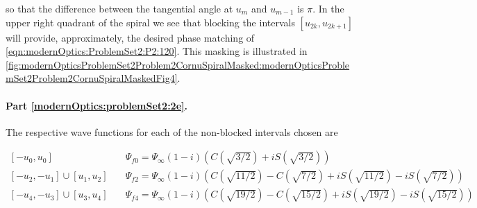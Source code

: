 {so that the difference between the tangential angle at $u_m$ and $u_{m-1}$ is $\pi$.  In the upper right quadrant of the spiral we see that blocking the intervals $[u_{2k}, u_{2k+1}]$ will provide, approximately, the desired phase matching of \ref{eqn:modernOptics:ProblemSet2:P2:120}.  This masking is illustrated in \cref{fig:modernOpticsProblemSet2Problem2CornuSpiralMasked:modernOpticsProblemSet2Problem2CornuSpiralMaskedFig4}.


\paragraph{Part \ref{modernOptics:problemSet2:2e}.  }

The respective wave functions for each of the non-blocked intervals chosen are

\begin{equation}\label{eqn:modernOptics:ProblemSet2:P2:180}
\begin{aligned}
[-u_0, u_0] &\quad \Psi_{f0} = \Psi_\infty (1 - i) \left( C\left(\sqrt{3/2}\right) + i S\left(\sqrt{3/2}\right) \right) \\
[-u_2, -u_1] \cup [u_1, u_2] &\quad \Psi_{f2} = \Psi_\infty (1 - i) \left( C\left(\sqrt{11/2}\right) - C\left(\sqrt{7/2}\right) + i S\left(\sqrt{11/2}\right) - iS\left(\sqrt{7/2}\right) \right) \\
[-u_4, -u_3] \cup [u_3, u_4] &\quad \Psi_{f4} = \Psi_\infty (1 - i) \left( C\left(\sqrt{19/2}\right) - C\left(\sqrt{15/2}\right) + i S\left(\sqrt{19/2}\right) - iS\left(\sqrt{15/2}\right) \right) \\
\end{aligned}
\end{equation}

}
